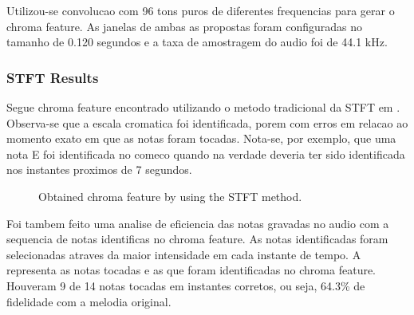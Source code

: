 \documentclass{article}
\begin{document}
	Utilizou-se convolucao com 96 tons puros de diferentes frequencias para gerar o chroma feature. As janelas de ambas as propostas foram configuradas no tamanho de 0.120 segundos e a taxa de amostragem do audio foi de 44.1 kHz.

	\subsubsection{STFT Results}
	Segue chroma feature encontrado utilizando o metodo tradicional da STFT em . Observa-se que a escala cromatica foi identificada, porem com erros em relacao ao momento exato em que as notas foram tocadas. Nota-se, por exemplo, que uma nota E foi identificada no comeco quando na verdade deveria ter sido identificada nos instantes proximos de 7 segundos.

	
	\begin{figure}[h]
	 \centerline{}
	 \caption{Obtained chroma feature by using the STFT method.}
	 \label{fig:1-ssft}
	\end{figure}	

	
	Foi tambem feito uma analise de eficiencia das notas gravadas no audio com a sequencia de notas identificas no chroma feature. As notas identificadas foram selecionadas atraves da maior intensidade em cada instante de tempo. A  representa as notas tocadas e as que foram identificadas no chroma feature. Houveram 9 de 14 notas tocadas em instantes corretos, ou seja, 64.3\% de fidelidade com a melodia original.

	\newpage
\end{document}
